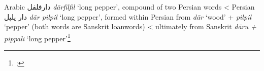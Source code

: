 \begin{etymology}\label{ety:darfilfil}
Arabic {دارفلفل} \textit{dārfilfil} `long pepper', compound of two Persian words
< Persian {دار پلپل} \textit{dār pilpil} `long pepper', formed within Persian from \textit{dār} `wood' + \textit{pilpil} `pepper' (both words are Sanskrit loanwords)
< ultimately from Sanskrit \textit{dāru + pippali} `long pepper'\footnote{\textcite[2435]{lane_arabic-english_1863}; }
\end{etymology}